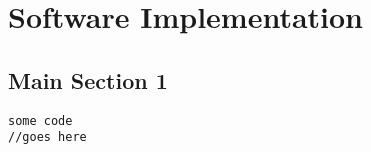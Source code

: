 
\chapter{Software Implementation} %

\label{c:soft-impl} %


\section{Main Section 1}
 
\begin{lstlisting}
some code
//goes here
\end{lstlisting}